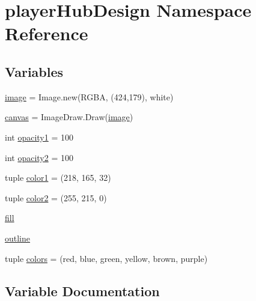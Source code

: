 \hypertarget{namespaceplayer_hub_design}{}\section{player\+Hub\+Design Namespace Reference}
\label{namespaceplayer_hub_design}
\subsection*{Variables}
\begin{DoxyCompactItemize}
\item 
\mbox{\hyperlink{namespaceplayer_hub_design_a96398433ff733949a02d9a1b0a1063f3}{image}} = Image.\+new(\textquotesingle{}R\+G\+BA\textquotesingle{}, (424,179), \textquotesingle{}white\textquotesingle{})
\item 
\mbox{\hyperlink{namespaceplayer_hub_design_a559e8f519f13a0a7e8b6a5dacfc19c34}{canvas}} = Image\+Draw.\+Draw(\mbox{\hyperlink{namespaceplayer_hub_design_a96398433ff733949a02d9a1b0a1063f3}{image}})
\item 
int \mbox{\hyperlink{namespaceplayer_hub_design_abdeef1a1cafd4170516fe45a39d70f9b}{opacity1}} = 100
\item 
int \mbox{\hyperlink{namespaceplayer_hub_design_ab93ef28d509fce4c27dfb7d79f62a07c}{opacity2}} = 100
\item 
tuple \mbox{\hyperlink{namespaceplayer_hub_design_a23ab77869183918708c920d5abdc0cab}{color1}} = (218, 165, 32)
\item 
tuple \mbox{\hyperlink{namespaceplayer_hub_design_aaab48b7ea47e453c93b1fe0b62a7c868}{color2}} = (255, 215, 0)
\item 
\mbox{\hyperlink{namespaceplayer_hub_design_aea763a33d803a9e6ea312f6e8f37c66a}{fill}}
\item 
\mbox{\hyperlink{namespaceplayer_hub_design_a08c37920d38bc93534db37bf91ed4013}{outline}}
\item 
tuple \mbox{\hyperlink{namespaceplayer_hub_design_a04c97cacd9af5e6e63100077470f4c10}{colors}} = (\textquotesingle{}red\textquotesingle{}, \textquotesingle{}blue\textquotesingle{}, \textquotesingle{}green\textquotesingle{}, \textquotesingle{}yellow\textquotesingle{}, \textquotesingle{}brown\textquotesingle{}, \textquotesingle{}purple\textquotesingle{})
\end{DoxyCompactItemize}


\subsection{Variable Documentation}
\mbox{\label{namespaceplayer_hub_design_a559e8f519f13a0a7e8b6a5dacfc19c34}} 
